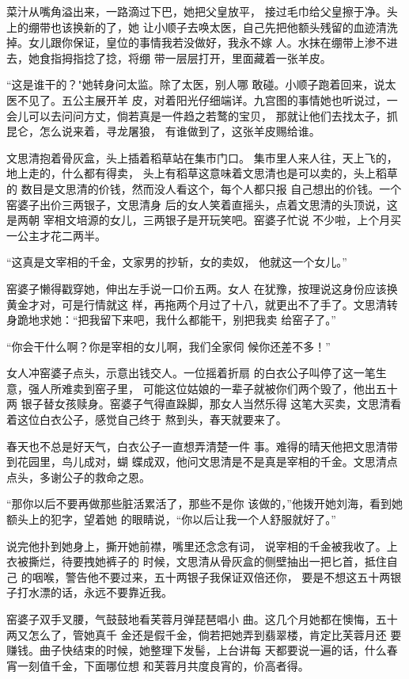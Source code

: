 菜汁从嘴角溢出来，一路滴过下巴，她把父皇放平，
接过毛巾给父皇擦于净。头上的绷带也该换新的了，她
让小顺子去唤太医，自己先把他额头残留的血迹清洗
掉。女儿跟你保证，皇位的事情我若没做好，我永不嫁
人。水抹在绷带上渗不进去，她食指拇指捻了捻，将绷
带一层层打开，里面藏着一张羊皮。

“这是谁干的？"她转身问太监。除了太医，别人哪
敢碰。小顺子跑着回来，说太医不见了。五公主展开羊
皮，对着阳光仔细端详。九宫图的事情她也听说过，一
会儿可以去问问方丈，倘若真是一件趋之若鹜的宝贝，
那就让他们去找太子，抓昆仑，怎么说来着，寻龙屠狼，
有谁做到了，这张羊皮赐给谁。
\newline

文思清抱着骨灰盒，头上插着稻草站在集市门口。
集市里人来人往，天上飞的，地上走的，什么都有得卖，
头上有稻草这意味着文思清也是可以卖的，头上稻草的
数目是文思清的价钱，然而没人看这个，每个人都只报
自己想出的价钱。一个窑婆子出价三两银子，文思清身
后的女人笑着直摇头，点着文思清的头顶说，这是两朝
宰相文培源的女儿，三两银子是开玩笑吧。窑婆子忙说
不少啦，上个月买一公主才花二两半。

“这真是文宰相的千金，文家男的抄斩，女的卖奴，
他就这一个女儿。”

窑婆子懒得戳穿她，伸出左手说一口价五两。女人
在犹豫，按理说这身份应该换黄金才对，可是行情就这
样，再拖两个月过了十八，就更出不了手了。文思清转
身跪地求她：“把我留下来吧，我什么都能干，别把我卖
给窑子了。”

“你会干什么啊？你是宰相的女儿啊，我们全家伺
候你还差不多！”

女人冲窑婆子点头，示意出钱交人。一位摇着折扇
的白衣公子叫停了这一笔生意，强人所难卖到窑子里，
可能这位姑娘的一辈子就被你们两个毁了，他出五十两
银子替女孩赎身。窑婆子气得直跺脚，那女人当然乐得
这笔大买卖，文思清看着这位白衣公子，感觉自己终于
熬到头，春天就要来了。

春天也不总是好天气，白衣公子一直想弄清楚一件
事。难得的晴天他把文思清带到花园里，鸟儿成对，蝴
蝶成双，他问文思清是不是真是宰相的千金。文思清点
点头，多谢公子的救命之恩。

“那你以后不要再做那些脏活累活了，那些不是你
该做的，”他拨开她刘海，看到她额头上的犯字，望着她
的眼睛说，“你以后让我一个人舒服就好了。”

说完他扑到她身上，撕开她前襟，嘴里还念念有词，
说宰相的千金被我收了。上衣被撕烂，待要拽她裤子的
时候，文思清从骨灰盒的侧壁抽出一把匕首，抵住自己
的咽喉，警告他不要过来，五十两银子我保证双倍还你，
要是不想这五十两银子打水漂的话，永远不要靠近我。

窑婆子双手叉腰，气鼓鼓地看芙蓉月弹琵琶唱小
曲。这几个月她都在懊悔，五十两又怎么了，管她真千
金还是假千金，倘若把她弄到翡翠楼，肯定比芙蓉月还
要赚钱。曲子快结束的时候，她整理下发髻，上台讲每
天都要说一遍的话，什么春宵一刻值千金，下面哪位想
和芙蓉月共度良宵的，价高者得。

